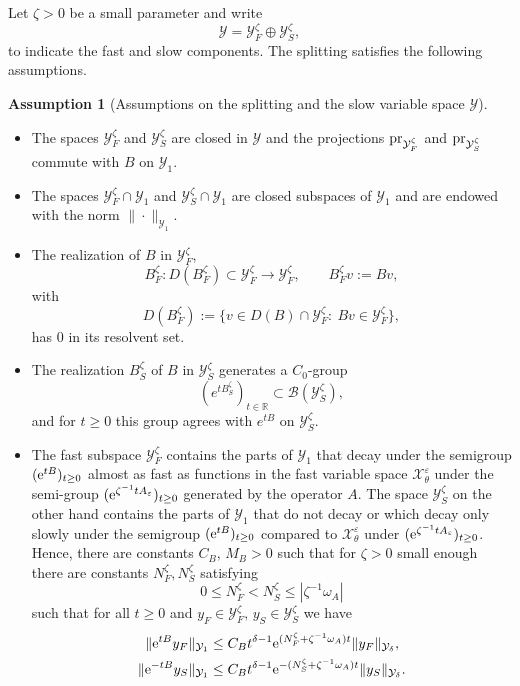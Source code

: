 \documentclass[11pt]{article}
\theoremstyle{definition}
\newtheorem{assumption}[theorem]{Assumption}
\theoremstyle{remark}
\numberwithin{equation}{section}
\newcommand{\eps}{\varepsilon}
\newcommand{\mc}[1]{\mathcal{#1}}
\newcommand{\pr}{\textnormal{pr}}
\begin{document}
Let \(\zeta>0\) be a small parameter and write
\[
\mc Y = \mc Y_F^\zeta \oplus \mc Y_S^\zeta,
\]
to indicate the fast and slow components.
The splitting satisfies the following assumptions.
\begin{assumption}[Assumptions on the splitting and the slow variable space $\mc Y$]\label{ass: splitting slow comp}
\leavevmode
\begin{itemize}
    \item The spaces $\mc Y^\zeta_F$ and $\mc Y^\zeta_S$ are closed in $\mc Y$ and the projections $\pr_{\mc Y^\zeta_F}$ and $\pr_{\mc Y^\zeta_S}$ commute with $B$ on $\mc Y_1$.
    \item The spaces $\mc Y^\zeta_F\cap \mc Y_1$ and $\mc Y^\zeta_S\cap \mc Y_1$ are closed subspaces of $\mc Y_1$ and are endowed with the norm $\|\cdot\|_{\mc Y_1}$.
    \item The realization of \(B\) in \(\mc Y_F^\zeta\),
    \[
    B_F^\zeta:D(B_F^\zeta)\subset \mc Y_F^\zeta\to \mc Y_F^\zeta,
    \qquad
    B_F^\zeta v:=Bv,
    \]
    with
    \[
    D(B_F^\zeta)
    :=
    \{v\in D(B)\cap \mc Y_F^\zeta:\ Bv\in \mc Y_F^\zeta\},
    \]
    has \(0\) in its resolvent set.
    \item The realization \(B_S^\zeta\) of \(B\) in \(\mc Y_S^\zeta\) generates a
    \(C_0\)-group
    \[
    (e^{tB_S^\zeta})_{t\in\mathbb R}
    \subset \mathcal B(\mc Y_S^\zeta),
    \]
    and for \(t\ge0\) this group agrees with \(e^{tB}\) on \(\mc Y_S^\zeta\).  
    \item The fast subspace $\mc Y^\zeta_F$ contains the parts of $\mc Y_1$ that decay under the semigroup $(\textnormal{e}^{tB})_{t\geq 0}$ almost as fast as functions in the fast variable space $\mc X_\theta^\eps$ under the semi-group $(\textnormal{e}^{\zeta^{-1}t A_\eps})_{t\geq 0}$ generated by the operator $A$.
    The space $\mc Y^\zeta_S$ on the other hand contains the parts of $\mc Y_1$ that do not decay or which decay only slowly under the semigroup $(\textnormal{e}^{tB})_{t\geq 0}$ compared to $\mc X_\theta^\eps$ under $(\textnormal{e}^{\zeta^{-1}t A_\eps})_{t\geq 0}$. 
    Hence, there are constants $C_B,\,M_B>0$ such that for $\zeta>0$ small enough there are constants $N_F^\zeta,N_S^\zeta$ satisfying   
    $$0\leq N_F^\zeta< N_S^\zeta\leq |\zeta^{-1}\omega_A|$$
    such that for all $t\geq 0$ and $y_F\in \mc Y^\zeta_F,\, y_S\in \mc Y^\zeta_S$ we have 
    \begin{align*}
        \|\textnormal{e}^{tB}y_F\|_{\mc Y_1}&\leq C_B t^{\delta -1} \textnormal{e}^{(N_F^\zeta +\zeta^{-1}\omega_A)t}\|y_F\|_{\mc Y_\delta},\\
        \|\textnormal{e}^{-tB}y_S\|_{\mc Y_1}&\leq C_B t^{\delta -1} \textnormal{e}^{-(N_S^\zeta +\zeta^{-1}\omega_A)t}\|y_S\|_{\mc Y_\delta}.
    \end{align*}
   

\end{itemize}
\end{assumption}
\end{document}
